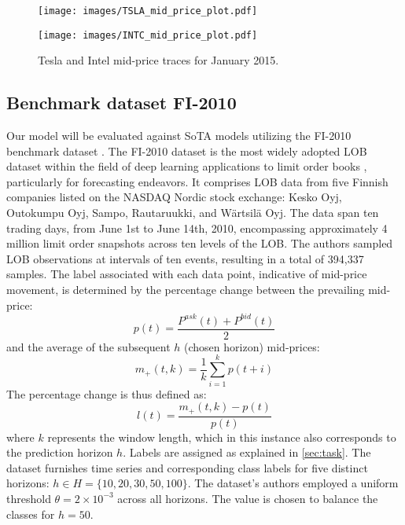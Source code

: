     
\begin{figure}[h!]
    \centering
        \begin{minipage}{\columnwidth} 
        \texttt{[image: images/TSLA\_mid\_price\_plot.pdf]}
        \end{minipage}
        \begin{minipage}{\columnwidth}
        \texttt{[image: images/INTC\_mid\_price\_plot.pdf]}
        \end{minipage}
    \caption{Tesla and Intel mid-price traces for January 2015.}
    \label{fig:stocks_trend_lob2022}
\end{figure}

\subsection{Benchmark dataset FI-2010}
\label{sec:fi-2010}
Our model will be evaluated against SoTA models utilizing the FI-2010 benchmark dataset \cite{urn:nbn:fi:csc-kata20170601153214969115}. The FI-2010 dataset \cite{urn:nbn:fi:csc-kata20170601153214969115} is the most widely adopted LOB dataset within the field of deep learning applications to limit order books \cite{zhang2019deeplob, zhang2020deep, tsantekidis2017forecasting, tsantekidis2017using}, particularly for forecasting endeavors. It comprises LOB data from five Finnish companies listed on the NASDAQ Nordic stock exchange: Kesko Oyj, Outokumpu Oyj, Sampo, Rautaruukki, and Wärtsilä Oyj. The data span ten trading days, from June 1st to June 14th, 2010, encompassing approximately 4 million limit order snapshots across ten levels of the LOB. The authors sampled LOB observations at intervals of ten events, resulting in a total of 394,337 samples.
The label associated with each data point, indicative of mid-price movement, is determined by the percentage change between the prevailing mid-price:
\begin{equation}
p(t) = \frac{P^{ask}(t) + P^{bid}(t)}{2}
\end{equation}
and the average of the subsequent $h$ (chosen horizon) mid-prices:
\begin{equation}
 m_+(t, k) = \frac{1}{k}\sum_{i=1}^k p(t+i)
\end{equation}
The percentage change is thus defined as:
\begin{equation}
l(t) = \frac{m_+(t, k) - p(t)}{p(t)} 
\end{equation}
where $k$ represents the window length, which in this instance also corresponds to the prediction horizon $h$.
Labels are assigned as explained in \ref{sec:task}. The dataset furnishes time series and corresponding class labels for five distinct horizons: $h \in H = \{10, 20, 30, 50, 100\}$. The dataset's authors employed a uniform threshold $\theta = 2\times 10^{-3}$ across all horizons. The value is chosen to balance the classes for $h = 50$. 



